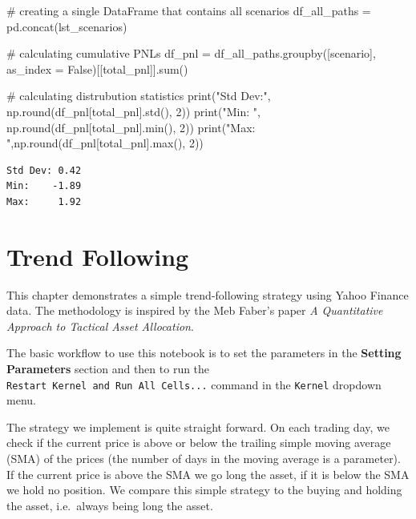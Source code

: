\documentclass[
  letterpaper,
  DIV=11,
  numbers=noendperiod]{scrreprt}
\newenvironment{Shaded}{\begin{snugshade}}{\end{snugshade}}
\newcommand{\BuiltInTok}[1]{\textcolor[rgb]{0.00,0.23,0.31}{#1}}
\newcommand{\CommentTok}[1]{\textcolor[rgb]{0.37,0.37,0.37}{#1}}
\newcommand{\DecValTok}[1]{\textcolor[rgb]{0.68,0.00,0.00}{#1}}
\newcommand{\NormalTok}[1]{\textcolor[rgb]{0.00,0.23,0.31}{#1}}
\newcommand{\OperatorTok}[1]{\textcolor[rgb]{0.37,0.37,0.37}{#1}}
\newcommand{\StringTok}[1]{\textcolor[rgb]{0.13,0.47,0.30}{#1}}
\newcommand{\VariableTok}[1]{\textcolor[rgb]{0.07,0.07,0.07}{#1}}
\begin{document}
\begin{Shaded}
\begin{Highlighting}[]
\CommentTok{\# creating a single DataFrame that contains all scenarios    }
\NormalTok{df\_all\_paths }\OperatorTok{=}\NormalTok{ pd.concat(lst\_scenarios)}

\CommentTok{\# calculating cumulative PNLs}
\NormalTok{df\_pnl }\OperatorTok{=}\NormalTok{ df\_all\_paths.groupby([}\StringTok{\textquotesingle{}scenario\textquotesingle{}}\NormalTok{], as\_index }\OperatorTok{=} \VariableTok{False}\NormalTok{)[[}\StringTok{\textquotesingle{}total\_pnl\textquotesingle{}}\NormalTok{]].}\BuiltInTok{sum}\NormalTok{()}

\CommentTok{\# calculating distrubution statistics}
\BuiltInTok{print}\NormalTok{(}\StringTok{"Std Dev:"}\NormalTok{, np.}\BuiltInTok{round}\NormalTok{(df\_pnl[}\StringTok{\textquotesingle{}total\_pnl\textquotesingle{}}\NormalTok{].std(), }\DecValTok{2}\NormalTok{))}
\BuiltInTok{print}\NormalTok{(}\StringTok{"Min:   "}\NormalTok{, np.}\BuiltInTok{round}\NormalTok{(df\_pnl[}\StringTok{\textquotesingle{}total\_pnl\textquotesingle{}}\NormalTok{].}\BuiltInTok{min}\NormalTok{(), }\DecValTok{2}\NormalTok{))}
\BuiltInTok{print}\NormalTok{(}\StringTok{"Max:    "}\NormalTok{,np.}\BuiltInTok{round}\NormalTok{(df\_pnl[}\StringTok{\textquotesingle{}total\_pnl\textquotesingle{}}\NormalTok{].}\BuiltInTok{max}\NormalTok{(), }\DecValTok{2}\NormalTok{))}
\end{Highlighting}
\end{Shaded}

\begin{verbatim}
Std Dev: 0.42
Min:    -1.89
Max:     1.92
\end{verbatim}

\hypertarget{trend-following}{%
\chapter{Trend Following}\label{trend-following}}

This chapter demonstrates a simple trend-following strategy using Yahoo
Finance data. The methodology is inspired by the Meb Faber's paper
\emph{A Quantitative Approach to Tactical Asset Allocation}.

The basic workflow to use this notebook is to set the parameters in the
\textbf{Setting Parameters} section and then to run the
\texttt{Restart\ Kernel\ and\ Run\ All\ Cells...} command in the
\texttt{Kernel} dropdown menu.

The strategy we implement is quite straight forward. On each trading
day, we check if the current price is above or below the trailing simple
moving average (SMA) of the prices (the number of days in the moving
average is a parameter). If the current price is above the SMA we go
long the asset, if it is below the SMA we hold no position. We compare
this simple strategy to the buying and holding the asset, i.e.~always
being long the asset.
\end{document}
